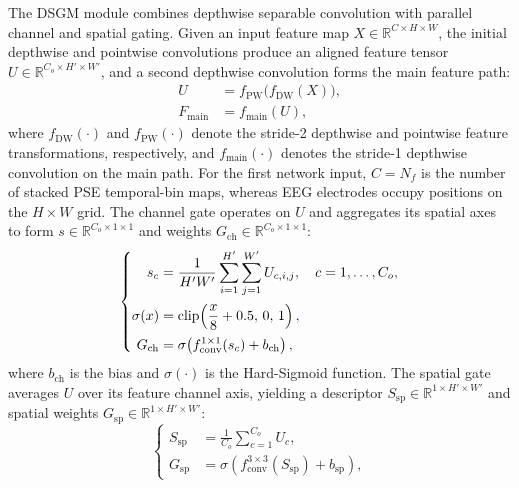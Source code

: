 \documentclass{nsr}
\begin{document}
The DSGM module combines depthwise separable convolution with parallel channel and spatial gating. Given an input feature map $X \in \mathbb{R}^{C\times H\times W}$, the initial depthwise and pointwise convolutions produce an aligned feature tensor $U\in\mathbb{R}^{C_o\times H'\times W'}$, and a second depthwise convolution forms the main feature path:
\begin{equation}
\begin{aligned}
U &= f_{\mathrm{PW}}\!\bigl(f_{\mathrm{DW}}(X)\bigr),\\
F_{\mathrm{main}} &= f_{\mathrm{main}}(U),
\end{aligned}
\label{eq:dsgm_backbone}
\end{equation}
where $f_{\mathrm{DW}}(\cdot)$ and $f_{\mathrm{PW}}(\cdot)$ denote the stride-2 depthwise and pointwise feature transformations, respectively, and $f_{\mathrm{main}}(\cdot)$ denotes the stride-1 depthwise convolution on the main path. For the first network input, $C=N_f$ is the number of stacked PSE temporal-bin maps, whereas EEG electrodes occupy positions on the $H\times W$ grid. The channel gate operates on $U$ and aggregates its spatial axes to form $s\in\mathbb{R}^{C_o\times1\times1}$ and weights $G_{\mathrm{ch}}\in\mathbb{R}^{C_o\times1\times1}$:
\begin{equation}
\left\{
\begin{aligned}
s_c &= \frac{1}{H'W'}\sum_{i=1}^{H'}\sum_{j=1}^{W'}U_{c,i,j},\quad c=1,\dots,C_o,\\[0.5mm]
\sigma(x) &= \mathrm{clip}\!\left(\frac{x}{8}+0.5,\,0,\,1\right){\color{blue},}\\[0.5mm]
G_{\mathrm{ch}} &= \sigma\!\left(f_{\mathrm{conv}}^{1\times1}(s_c)+b_{\mathrm{ch}}\right),
\end{aligned}
\right.
\label{eq:dsgm_ch_gate}
\end{equation}
where $b_{\mathrm{ch}}$ is the bias and $\sigma(\cdot)$ is the Hard-Sigmoid function. The spatial gate averages $U$ over its feature channel axis, yielding a descriptor $S_{\mathrm{sp}}\in\mathbb{R}^{1\times H'\times W'}$ and spatial weights $G_{\mathrm{sp}}\in\mathbb{R}^{1\times H'\times W'}$:
\begin{equation}
\left\{
\begin{aligned}
S_{\mathrm{sp}} &= \frac{1}{C_o}\sum_{c=1}^{C_o}U_c,\\[0.5mm]
G_{\mathrm{sp}} &= \sigma\!\left(f_{\mathrm{conv}}^{3\times3}(S_{\mathrm{sp}})+b_{\mathrm{sp}}\right),
\end{aligned}
\right.
\label{eq:dsgm_sp_gate}
\end{equation}
\end{document}
